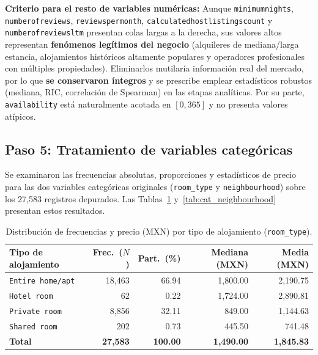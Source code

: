 \documentclass[12pt,letterpaper,oneside]{report}
\newcommand{\ub}{\textunderscore\allowbreak}
\begin{document}
\textbf{Criterio para el resto de variables numéricas:} Aunque \texttt{minimum\ub nights}, \texttt{number\ub of\ub reviews}, \texttt{reviews\ub per\ub month}, \texttt{calculated\ub host\ub listings\ub count} y \texttt{number\ub of\ub reviews\ub ltm} presentan colas largas a la derecha, sus valores altos representan \textbf{fenómenos legítimos del negocio} (alquileres de mediana/larga estancia, alojamientos históricos altamente populares y operadores profesionales con múltiples propiedades). Eliminarlos mutilaría información real del mercado, por lo que \textbf{se conservaron íntegros} y se prescribe emplear estadísticos robustos (mediana, RIC, correlación de Spearman) en las etapas analíticas. Por su parte, \texttt{availability\ub 365} está naturalmente acotada en $[0, 365]$ y no presenta valores atípicos.

\subsection{Paso 5: Tratamiento de variables categóricas}
\label{subsec:paso5}

Se examinaron las frecuencias absolutas, proporciones y estadísticos de precio para las dos variables categóricas originales (\texttt{room\_type} y \texttt{neighbourhood}) sobre los 27,583 registros depurados. Las Tablas~\ref{tab:cat_room_type} y~\ref{tab:cat_neighbourhood} presentan estos resultados.

\begin{table}[htbp]
\centering
\caption{Distribución de frecuencias y precio (MXN) por tipo de alojamiento (\texttt{room\_type}).}
\label{tab:cat_room_type}
\footnotesize
\renewcommand{\arraystretch}{1.15}
\begin{tabular}{l r r r r}
\toprule
\rowcolor{TableHeader}
\textbf{Tipo de alojamiento} & \textbf{Frec.\ ($N$)} & \textbf{Part.\ (\%)} & \textbf{Mediana (MXN)} & \textbf{Media (MXN)} \\
\midrule
\texttt{Entire home/apt} & 18,463 & 66.94 & 1,800.00 & 2,190.75 \\
\texttt{Hotel room}      &     62 &  0.22 & 1,724.00 & 2,890.81 \\
\texttt{Private room}    &  8,856 & 32.11 &   849.00 & 1,144.63 \\
\texttt{Shared room}     &    202 &  0.73 &   445.50 &   741.48 \\
\midrule
\textbf{Total}           & \textbf{27,583} & \textbf{100.00} & \textbf{1,490.00} & \textbf{1,845.83} \\
\bottomrule
\end{tabular}
\end{table}
\end{document}
